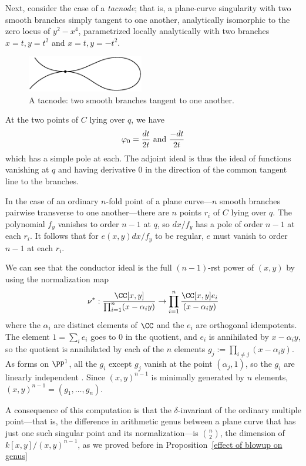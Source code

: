 \begin{example}[tacnodes]
Next, consider the case of a \emph{tacnode}; that is, a plane-curve singularity with two smooth branches simply tangent to one another, analytically isomorphic to the zero locus of $y^2-x^4$, parametrized locally analytically with two branches $x = t, y =  t^{2}$ and $x=t, y = -t^{2}$.

\begin{figure}
\centerline {\includegraphics[width=2in]{"main/Fig14-4"}}
\caption{A tacnode: two smooth branches tangent to one another.}
\label{Fig14.4}
\end{figure}

At the two points of $C$ lying over $q$, we have
  $$
 \varphi_0 =  \frac{dt}{ 2t} \hbox{ and } \frac{-dt}{ 2t}
 $$ 
which has a simple pole at each. 
The adjoint ideal is thus the ideal of functions vanishing at $q$ and having derivative 0 in the direction of the common tangent line to the branches.
\end{example}

\begin{example}
In the case of an ordinary $n$-fold point of a plane curve---$n$ smooth branches pairwise transverse to one another---there are $n$ points
$r_i$ of $C$ lying over $q$. The polynomial $f_y$ vanishes to order $n-1$ at $q$, so $dx/f_y$ has a pole of order $n-1$ at
each $r_i$. It follows that for $e(x,y)dx/f_y$ to be regular, $e$ must vanish to order $n-1$ at each $r_i$. 

We can see that the conductor ideal is the full $(n-1)$-rst power of $(x,y)$ by using the
normalization map
$$
\nu^{*}: \frac{\CC[x,y]}{\prod_{i=1}^{n} (x-\alpha_{i}y)} \to
 \prod_{i=1}^{n} \frac{\CC[x,y]e_{i}}{(x-\alpha_{i}y)}
$$
where the $\alpha_{i}$ are distinct elements of $\CC$ and the $e_{i}$ are orthogonal idempotents.
The element $1 = \sum_{i}e_{i}$ goes to 0 in the quotient, and $e_{i}$ is annihilated by $x-\alpha_{i}y$,
so the quotient is annihilated by each of the $n$ elements $g_{j} := \prod_{i\neq j} (x-\alpha_{i}y)$.
As forms on $\PP^{1}$, all the $g_{i}$ except $g_{j}$ vanish at the 
point $(\alpha_{j}, 1)$, so the $g_{i}$ are linearly independent . Since $(x,y)^{n-1}$ is minimally generated by $n$ elements, $(x,y)^{n-1} = (g_{1}, \dots, g_{n})$.

A consequence of this computation is that the $\delta$-invariant of the ordinary multiple point---that is, the difference in arithmetic genus between a plane curve that has just one such singular point and its normalization---is $\binom{n}{2}$, the dimension of $k[x,y]/(x,y)^{n-1}$, as we proved before in Proposition~\ref{effect of blowup on genus} \end{example}

